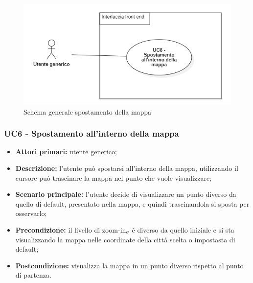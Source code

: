 \begin{center}
	\begin{figure}[H]
		\centering\includegraphics[scale=0.8]{../immagini/attori_casi/UC_6.png}
		\caption{Schema generale spostamento della mappa}
	\end{figure}
\end{center}


\subsubsection{UC6 - Spostamento all'interno della mappa}\label{CasiDUsoCasiDUsoTraUnUtenteEIlFrontEndElencoCasiDUsoUC311SpostamentoDelCentroDellaMappa}

\begin{itemize}
	\item \textbf{Attori primari:} utente generico;
	\item \textbf{Descrizione:} l’utente può spostarsi all’interno della mappa, utilizzando il cursore può trascinare la mappa nel punto che vuole visualizzare;
	\item \textbf{Scenario principale:} l'utente decide di visualizzare un punto diverso da quello di default, presentato nella mappa, e quindi trascinandola si sposta per osservarlo;
	\item \textbf{Precondizione:} il livello di zoom-in$_{\scaleto{G}{3pt}}$ è diverso da quello iniziale e si sta visualizzando la mappa nelle coordinate della città scelta o impostasta di default;
	\item \textbf{Postcondizione:} visualizza la mappa in un punto diverso rispetto al punto di partenza.
\end{itemize}

